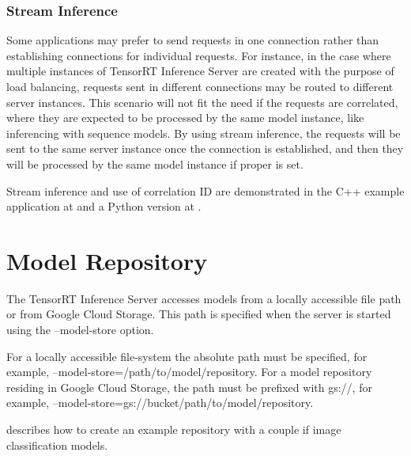 \documentclass[letterpaper,10pt,english]{sphinxmanual}
\begin{document}
\subsection{Stream Inference}
\label{\detokenize{client:stream-inference}}
Some applications may prefer to send requests in one connection rather than
establishing connections for individual requests. For instance, in the case
where multiple instances of TensorRT Inference Server are created with the
purpose of load balancing, requests sent in different connections may be routed
to different server instances. This scenario will not fit the need if the
requests are correlated, where they are expected to be processed by the same
model instance, like inferencing with sequence models. By using stream
inference, the requests will be sent to the same server instance once the
connection is established, and then they will be processed by the same model
instance if proper  is set.

Stream inference and use of correlation ID are demonstrated in the C++ example
application at
and a Python version at .


\chapter{Model Repository}
\label{\detokenize{model_repository:model-repository}}\label{\detokenize{model_repository:section-model-repository}}\label{\detokenize{model_repository::doc}}
The TensorRT Inference Server accesses models from a locally
accessible file path or from Google Cloud Storage. This path is
specified when the server is started using the --model-store option.

For a locally accessible file-system the absolute path must be
specified, for example, --model-store=/path/to/model/repository. For
a model repository residing in Google Cloud Storage, the path must be
prefixed with gs://, for example,
--model-store=gs://bucket/path/to/model/repository.

{\hyperref[\detokenize{run:section-example-model-repository}]{}} describes how to create an
example repository with a couple if image classification models.
\end{document}
